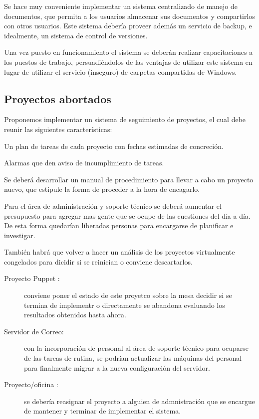 \documentclass[a4paper,11pt,oneside]{article}
\begin{document}
Se hace muy conveniente implementar un sistema centralizado de manejo
de documentos, que permita a los usuarios almacenar sus documentos y
compartirlos con otros usuarios. Este sistema debería proveer además
un servicio de backup, e idealmente, un sistema de control de
versiones.

Una vez puesto en funcionamiento el sistema se deberán realizar
capacitaciones a los puestos de trabajo, persuadiéndolos de las
ventajas de utilizar este sistema en lugar de utilizar el servicio
(inseguro) de carpetas compartidas de Windows.

\subsection*{Proyectos abortados}
Proponemos implementar un sistema de seguimiento de proyectos, el cual
debe reunir las siguientes características:
\begin{itemize*}
\item Un plan de tareas de cada proyecto con fechas estimadas de
  concreción.
\item Alarmas que den aviso de incumplimiento de tareas.
\end{itemize*}
Se deberá desarrollar un manual de procedimiento para llevar a cabo un
proyecto nuevo, que estipule la forma de proceder a la hora de
encagarlo.

Para el área de administración y soporte técnico se deberá aumentar el
presupuesto para agregar mas gente que se ocupe de las cuestiones del
día a día. De esta forma quedarían liberadas personas para encargarse
de planificar e investigar.

También habrá que volver a hacer un análisis de los proyectos
virtualmente congelados para dicidir si se reinician o conviene
descartarlos.

\begin{description}
\item[Proyecto Puppet :]conviene poner el estado de este proyetco
  sobre la mesa decidir si se termina de implementr o directamente se
  abandona evaluando los resultados obtenidos hasta ahora.
\item[Servidor de Correo:] con la incorporación de personal al área de
  soporte técnico para ocuparse de las tareas de rutina, se podrían
  actualizar las máquinas del personal para finalmente migrar a la
  nueva configuración del servidor.
\item[Proyecto/oficina :]se debería reasignar el proyecto a alguien de
  admnistración que se encargue de mantener y terminar de implementar
  el sistema.
\end{description}
\end{document}
